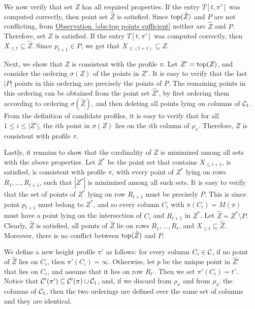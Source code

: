 \documentclass[11pt]{article}
\numberwithin{equation}{section}
\theoremstyle{definition}
\theoremstyle{plain}
\newcommand{\expref}[2]{\hyperref[#2]{#1~\ref{#2}}}
\begin{document}
We now verify that set $Z$ has all required properties. If the entry $T[t,\pi']$ was computed correctly, then point set $\hat Z$ is satisfied. Since $\operatorname{top}(\hat Z)$ and $P$ are not conflicting, from \expref{Observation}{obs:top points sufficient} neither are $\hat Z$ and $P$. Therefore, set $Z$ is satisfied. 
If the entry $T[t,\pi']$ was computed correctly, then $X_{\leq t}\subseteq \hat Z$. Since $p_{t+1}\in P$, we get that $X_{\leq (t+1)}\subseteq Z$. 

Next, we show that $Z$ is consistent with the profile $\pi$. Let $Z'=\operatorname{top}(Z)$, and consider the ordering $\sigma(Z)$ of the points in $Z'$. It is easy to verify that the last $|P|$ points in this ordering are precisely the points of $P$. The remaining points in this ordering can be obtained from the point set $\hat Z'$, by first ordering them according to ordering $\sigma(\hat Z)$, and then deleting all points lying on columns of ${\mathcal C}_1$. From the definition of candidate profiles, it is easy to verify that for all $1\leq i\leq |Z'|$, the $i$th point in $\sigma(Z)$ lies on the $i$th column of $\rho_{\pi}$. Therefore, $Z$ is consistent with profile $\pi$.


Lastly, it remains to show that the cardinality of $Z$ is minimized among all sets with the above properties. Let $Z^*$ be the point set that contains $X_{\leq t+1}$, is satisfied, is consistent with profile $\pi$, with every point of $Z^*$ lying on rows $R_1,\ldots,R_{t+1}$,  such that $|Z^*|$ is minimized among all such sets. It is easy to verify that the set of points of $Z^*$ lying on row $R_{t+1}$ must be precisely $P$. This is since point $p_{t+1}$ must belong to $Z^*$, and so every column $C_i$ with $\pi(C_i)=M(\pi)$ must have a point lying on the intersection of $C_i$ and $R_{t+1}$ in $Z^*$. Let $\hat Z=Z^*\setminus P$.
Clearly, $\hat Z$ is satisfied, all points of $\hat Z$ lie on rows $R_1,\ldots,R_t$, and $X_{\leq t}\subseteq \hat Z$. Moreover, there is no conflict between $\operatorname{top}(\hat Z)$ and $P$.

We define a new height profile $\pi'$ as follows: for every column $C_i\in {\mathcal C}$, if no point of $\hat Z$ lies on $C_i$, then $\pi'(C_i)=\infty$. Otherwise, let $p$ be the unique point in $\hat Z'$ that lies on $C_i$, and assume that it lies on row $R_{t'}$. Then we set $\pi'(C_i)=t'$. Notice that ${\mathcal C}'(\pi')\subseteq {\mathcal C}'(\pi)\cup {\mathcal C}_1$, and, if we discard from $\rho_{\pi}$ and from $\rho_{\pi'}$ the columns of ${\mathcal C}_1$, then the two orderings are defined over the same set of columns and they are identical.
\end{document}

